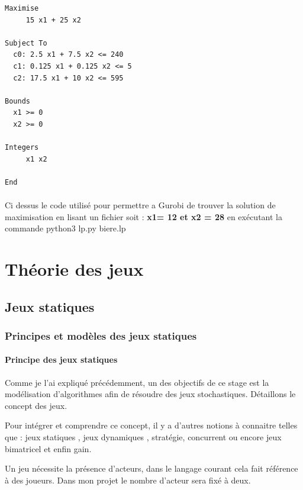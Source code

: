 \documentclass[a4paper, 12pt, twoside]{article}
\begin{document}
\begin{verbatim}
Maximise
     15 x1 + 25 x2

Subject To 
  c0: 2.5 x1 + 7.5 x2 <= 240 
  c1: 0.125 x1 + 0.125 x2 <= 5
  c2: 17.5 x1 + 10 x2 <= 595  
  
Bounds
  x1 >= 0
  x2 >= 0
  
Integers
     x1 x2 
  
End
\end{verbatim}

\paragraph*{}{Ci dessus le code  utilisé pour permettre a \textsf{Gurobi} de trouver la solution de maximisation en lisant un fichier  soit  : \textbf{x1= 12 et x2 = 28} en exécutant la commande \textsf{python3 lp.py biere.lp}}




\newpage

\section{Théorie des jeux}

\subsection{Jeux statiques}
\subsubsection{Principes et modèles des jeux statiques }
\paragraph{Principe des jeux statiques}
Comme je l'ai expliqué précédemment, un des objectifs de ce stage est la modélisation d'algorithmes afin de résoudre des jeux stochastiques. Détaillons le concept des \textsf{jeux}. \newline

Pour intégrer et comprendre ce concept, il y a d'autres notions à connaitre telles que : \textsf{jeux statiques} , \textsf{jeux dynamiques} , \textsf{stratégie}, \textsf{concurrent}  ou encore \textsf{jeux bimatricel} et enfin \textsf{gain}.\newline

Un jeu nécessite la présence d'acteurs, dans le langage courant cela fait référence à des \textsf{joueurs}. Dans mon projet le nombre d'acteur sera fixé à deux.
\end{document}

